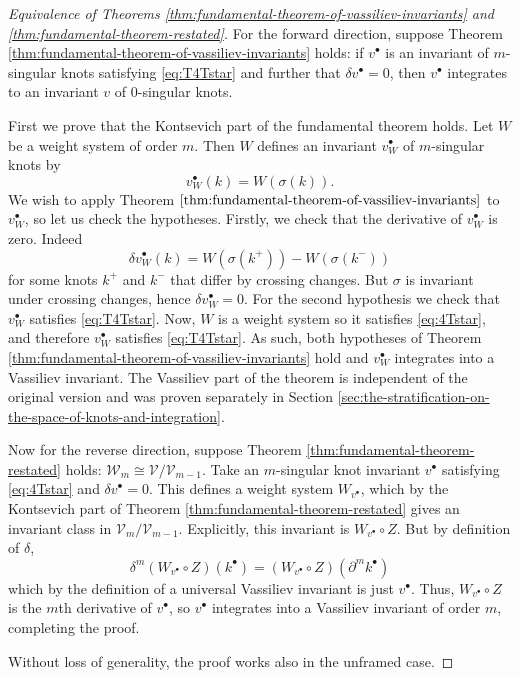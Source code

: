 \begin{proof}[Equivalence of Theorems \ref{thm:fundamental-theorem-of-vassiliev-invariants} and \ref{thm:fundamental-theorem-restated}]
	For the forward direction, suppose Theorem \ref{thm:fundamental-theorem-of-vassiliev-invariants} holds: if \(v^{\bullet}\) is an invariant of \(m\)-singular knots satisfying \ref{eq:T4Tstar} and further that \(\delta v^{\bullet} = 0\), then \(v^{\bullet}\) integrates to an invariant \(v\) of \(0\)-singular knots.

	First we prove that the Kontsevich part of the fundamental theorem holds. Let \(W\) be a weight system of order \(m\). Then \(W\) defines an invariant \(v_{W}^{\bullet}\) of \(m\)-singular knots by
	\[v_{W}^{\bullet}(k) = W(\sigma(k)).\]
	We wish to apply Theorem \(\ref{thm:fundamental-theorem-of-vassiliev-invariants}\) to \(v_{W}^{\bullet}\), so let us check the hypotheses. Firstly, we check that the derivative of \(v_{W}^{\bullet}\) is zero. Indeed
	\[\delta v_{W}^{\bullet}(k) = W(\sigma(k^{+})) - W(\sigma(k^{-}))\]
	for some knots \(k^{+}\) and \(k^{-}\) that differ by crossing changes. But \(\sigma\) is invariant under crossing changes, hence \(\delta v_{W}^{\bullet} = 0\). For the second hypothesis we check that \(v_{W}^{\bullet}\) satisfies \ref{eq:T4Tstar}. Now, \(W\) is a weight system so it satisfies \ref{eq:4Tstar}, and therefore \(v_{W}^{\bullet}\) satisfies \ref{eq:T4Tstar}. As such, both hypotheses of Theorem \ref{thm:fundamental-theorem-of-vassiliev-invariants} hold and \(v_{W}^{\bullet}\) integrates into a Vassiliev invariant. The Vassiliev part of the theorem is independent of the original version and was proven separately in Section \ref{sec:the-stratification-on-the-space-of-knots-and-integration}.

	Now for the reverse direction, suppose Theorem \ref{thm:fundamental-theorem-restated} holds: \(\mathcal{W}_{m} \cong \mathcal{V}/\mathcal{V}_{m - 1}\). Take an \(m\)-singular knot invariant \(v^{\bullet}\) satisfying \ref{eq:4Tstar} and \(\delta v^{\bullet} = 0\). This defines a weight system \(W_{v^{\bullet}}\), which by the Kontsevich part of Theorem \ref{thm:fundamental-theorem-restated} gives an invariant class in \(\mathcal{V}_{m} / \mathcal{V}_{m - 1}\). Explicitly, this invariant is \(W_{v^{\bullet}} \circ Z\). But by definition of \(\delta\),
		\[
			\delta^{m} (W_{v^{\bullet}} \circ Z)(k^{\bullet})
			=
			(W_{v^{\bullet}} \circ Z)(\partial^{m} k^{\bullet})
		\]
	which by the definition of a universal Vassiliev invariant is just \(v^{\bullet}\). Thus, \(W_{v^{\bullet}} \circ Z\) is the \(m\)th derivative of \(v^{\bullet}\), so \(v^{\bullet}\) integrates into a Vassiliev invariant of order \(m\), completing the proof.

	Without loss of generality, the proof works also in the unframed case.
\end{proof}
